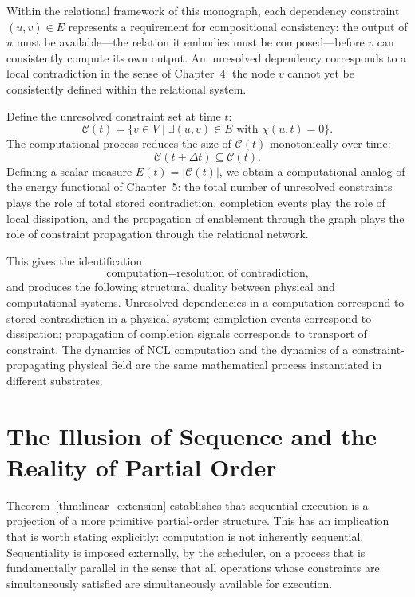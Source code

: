 \documentclass[12pt,a4paper,openany]{book}
\theoremstyle{plain}
\theoremstyle{definition}
\theoremstyle{remark}
\begin{document}
Within the relational framework of this monograph, each dependency constraint $(u, v) \in E$ represents a requirement for compositional consistency: the output of $u$ must be available---the relation it embodies must be composed---before $v$ can consistently compute its own output. An unresolved dependency corresponds to a local contradiction in the sense of Chapter~4: the node $v$ cannot yet be consistently defined within the relational system.

Define the unresolved constraint set at time $t$:
\[
\mathcal{C}(t) = \bigl\{ v \in V \mid \exists (u, v) \in E \text{ with } \chi(u, t) = 0 \bigr\}.
\]
The computational process reduces the size of $\mathcal{C}(t)$ monotonically over time:
\[
\mathcal{C}(t + \Delta t) \subseteq \mathcal{C}(t).
\]
Defining a scalar measure $E(t) = \lvert \mathcal{C}(t) \rvert$, we obtain a computational analog of the energy functional of Chapter~5: the total number of unresolved constraints plays the role of total stored contradiction, completion events play the role of local dissipation, and the propagation of enablement through the graph plays the role of constraint propagation through the relational network.

This gives the identification
\[
\text{computation} = \text{resolution of contradiction,}
\]
and produces the following structural duality between physical and computational systems. Unresolved dependencies in a computation correspond to stored contradiction in a physical system; completion events correspond to dissipation; propagation of completion signals corresponds to transport of constraint. The dynamics of NCL computation and the dynamics of a constraint-propagating physical field are the same mathematical process instantiated in different substrates.

\section{The Illusion of Sequence and the Reality of Partial Order}

Theorem~\ref{thm:linear_extension} establishes that sequential execution is a projection of a more primitive partial-order structure. This has an implication that is worth stating explicitly: computation is not inherently sequential. Sequentiality is imposed externally, by the scheduler, on a process that is fundamentally parallel in the sense that all operations whose constraints are simultaneously satisfied are simultaneously available for execution.
\end{document}
